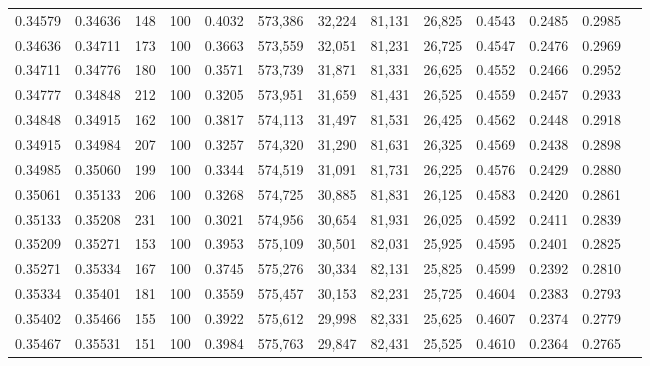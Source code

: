 \begin{tabular}{rrrrrrrrrrrrr}
0.34579 & 0.34636 &   148 & 100 &                                     0.4032 & 573,386 &  32,224 &  81,131 &  26,825 & 0.4543 & 0.2485 & 0.2985 \\
0.34636 & 0.34711 &   173 & 100 &                                     0.3663 & 573,559 &  32,051 &  81,231 &  26,725 & 0.4547 & 0.2476 & 0.2969 \\
0.34711 & 0.34776 &   180 & 100 &                                     0.3571 & 573,739 &  31,871 &  81,331 &  26,625 & 0.4552 & 0.2466 & 0.2952 \\
0.34777 & 0.34848 &   212 & 100 &                                     0.3205 & 573,951 &  31,659 &  81,431 &  26,525 & 0.4559 & 0.2457 & 0.2933 \\
0.34848 & 0.34915 &   162 & 100 &                                     0.3817 & 574,113 &  31,497 &  81,531 &  26,425 & 0.4562 & 0.2448 & 0.2918 \\
0.34915 & 0.34984 &   207 & 100 &                                     0.3257 & 574,320 &  31,290 &  81,631 &  26,325 & 0.4569 & 0.2438 & 0.2898 \\
0.34985 & 0.35060 &   199 & 100 &                                     0.3344 & 574,519 &  31,091 &  81,731 &  26,225 & 0.4576 & 0.2429 & 0.2880 \\
0.35061 & 0.35133 &   206 & 100 &                                     0.3268 & 574,725 &  30,885 &  81,831 &  26,125 & 0.4583 & 0.2420 & 0.2861 \\
0.35133 & 0.35208 &   231 & 100 &                                     0.3021 & 574,956 &  30,654 &  81,931 &  26,025 & 0.4592 & 0.2411 & 0.2839 \\
0.35209 & 0.35271 &   153 & 100 &                                     0.3953 & 575,109 &  30,501 &  82,031 &  25,925 & 0.4595 & 0.2401 & 0.2825 \\
0.35271 & 0.35334 &   167 & 100 &                                     0.3745 & 575,276 &  30,334 &  82,131 &  25,825 & 0.4599 & 0.2392 & 0.2810 \\
0.35334 & 0.35401 &   181 & 100 &                                     0.3559 & 575,457 &  30,153 &  82,231 &  25,725 & 0.4604 & 0.2383 & 0.2793 \\
0.35402 & 0.35466 &   155 & 100 &                                     0.3922 & 575,612 &  29,998 &  82,331 &  25,625 & 0.4607 & 0.2374 & 0.2779 \\
0.35467 & 0.35531 &   151 & 100 &                                     0.3984 & 575,763 &  29,847 &  82,431 &  25,525 & 0.4610 & 0.2364 & 0.2765 \\

\end{tabular}
